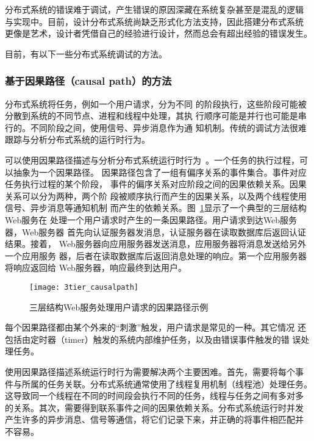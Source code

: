 分布式系统的错误难于调试，产生错误的原因深藏在系统复杂甚至是混乱的逻辑
与实现中。目前，设计分布式系统尚缺乏形式化方法支持，因此搭建分布式系统
更像是艺术，设计者凭借自己的经验进行设计，然而总会有超出经验的错误发生。


目前，有以下一些分布式系统调试的方法。

\subsubsection*{基于因果路径（causal path）的方法}



分布式系统将任务，例如一个用户请求，分为不同
的阶段执行，这些阶段可能被分散到系统的不同节点、进程和线程中处理，其执
行顺序可能是并行也可能是串行的。不同阶段之间，使用信号、异步消息作为通
知机制。传统的调试方法很难跟踪与分析分布式系统的运行时行为。

可以使用因果路径描述与分析分布式系统运行时行为~\cite{pinpoint, magpie,
pip, x-trace, project5}。一个任务的执行过程，可以抽象为一个因果路径。
因果路径包含了一组有偏序关系的事件集合。事件对应任务执行过程的某个阶段，
事件的偏序关系对应阶段之间的因果依赖关系。因果关系可以分为两种，两个阶
段被顺序执行而产生的因果关系，以及两个线程使用信号、异步消息等通知机制
而产生的依赖关系。图~\ref{fig:3tier}显示了一个典型的三层结构Web服务在
处理一个用户请求时产生的一条因果路径。用户请求到达Web服务器，Web服务器
首先向认证服务器发消息，认证服务器在读取数据库后返回认证结果。接着，
Web服务器向应用服务器发送消息，应用服务器将消息发送给另外一个应用服务
器，后者在读取数据库后返回消息处理的响应。第一个应用服务器将响应返回给
Web服务器，响应最终到达用户。

\begin{figure}
\centering
\texttt{[image: 3tier\_causalpath]}
\caption{三层结构Web服务处理用户请求的因果路径示例}
\label{fig:3tier}
\end{figure}

每个因果路径都由某个外来的“刺激”触发，用户请求是常见的一种。其它情况
还包括由定时器（timer）触发的系统内部维护任务，以及由错误事件触发的错
误处理任务。

使用因果路径描述系统运行时行为需要解决两个主要困难。首先，需要将每个事
件与所属的任务关联。分布式系统通常使用了线程复用机制（线程池）处理任务。
这导致同一个线程在不同的时间段会执行不同的任务，线程与任务之间有多对多
的关系。其次，需要得到联系事件之间的因果依赖关系。分布式系统运行时并发
产生许多的异步消息、信号等通信，将它们记录下来，并正确的将事件相匹配并
不容易。


